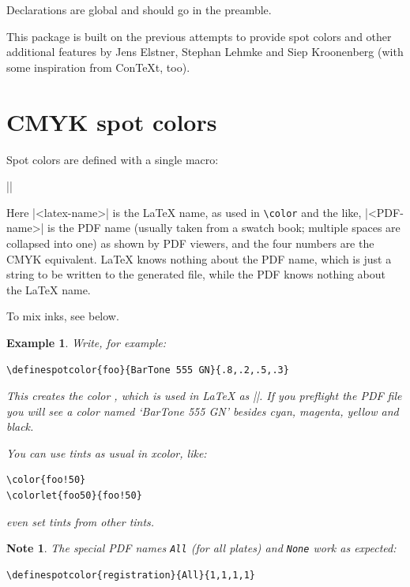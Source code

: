 \documentclass[a4paper]{ltxguide}
\newif\ifcolorspace
\def\showclr#1#{\testclr{#1}}
\def\testclr#1#2{{\fboxsep0pt\fbox{\colorbox#1{#2}{\phantom{,MM}}}}}
\newtheorem{note}{Note}
\newtheorem{example}{Example}
\begin{document}
Declarations are global and should go in the preamble.

This package is built on the previous attempts to provide spot colors
and other additional features by Jens Elstner, Stephan Lehmke and Siep
Kroonenberg (with some inspiration from \textsf{ConTeXt}, too).

\section{CMYK spot colors}

Spot colors are defined with a single macro:

\begin{decl}
||
\end{decl}

Here |<latex-name>| is the \LaTeX{} name, as used in \verb|\color| and
the like, |<PDF-name>| is the PDF name (usually taken from a swatch
book; multiple spaces are collapsed into one) as shown by PDF viewers,
and the four numbers are the CMYK equivalent. \LaTeX{} knows nothing
about the PDF name, which is just a string to be written to the
generated file, while the PDF knows nothing about the \LaTeX{} name.

To mix inks, see below.

\begin{example}
  Write, for example:
\begin{verbatim}
\definespotcolor{foo}{BarTone 555 GN}{.8,.2,.5,.3}
\end{verbatim}
  This creates the color , which is used in \LaTeX{} as
  |\color{foo}|. If you preflight the PDF file you will see a color
  named `BarTone 555 GN' besides cyan, magenta, yellow and black.

You can use tints as usual in \textsf{xcolor}, like:
\begin{verbatim}
\color{foo!50}
\colorlet{foo50}{foo!50}
\end{verbatim}
\ifcolorspace
  which would produce \showclr{foo!50}, and
\fi
even set tints from other tints. 
\end{example}

\begin{note}
  The special PDF names \verb|All| (for all plates) and \verb|None|
  work as expected:
\begin{verbatim}
\definespotcolor{registration}{All}{1,1,1,1}
\end{verbatim}
\end{note}
\end{document}
